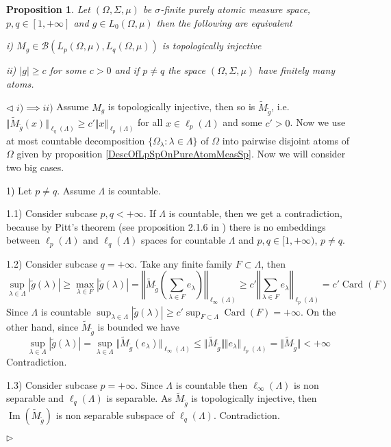 \documentclass[12pt]{article}
\newtheorem{proposition}[theorem]{Proposition}
\newenvironment{proof}{\par $\triangleleft$}{$\triangleright$}
\begin{document}
\begin{proposition}\label{TopInjMultOpCharacOnPureAtomMeasSp} Let $(\Omega,\Sigma,\mu)$ be $\sigma$-finite purely atomic measure space, $p,q\in[1,+\infty]$ and $g\in L_0(\Omega,\mu)$ then the following are equivalent

i) $M_g\in\mathcal{B}(L_p(\Omega,\mu),L_q(\Omega,\mu))$ is topologically injective

ii) $|g|\geq c$ for some $c>0$ and if $p\neq q$ the space $(\Omega,\Sigma,\mu)$ have finitely many atoms.
\end{proposition}
\begin{proof}
$i)\implies ii)$ Assume $M_g$ is topologically injective, then so is $\widetilde{M}_{\widetilde{g}}$, i.e. $\Vert\widetilde{M}_{\widetilde{g}}(x)\Vert_{\ell_q(\Lambda)}\geq c'\Vert x\Vert_{\ell_p(\Lambda)}$ for all $x\in\ell_p(\Lambda)$ and some $c'>0$. Now we use at most countable decomposition $\{\Omega_\lambda:\lambda\in\Lambda\}$ of $\Omega$ into pairwise disjoint atoms of $\Omega$ given by proposition \ref{DescOfLpSpOnPureAtomMeasSp}. Now we will consider two big cases.

1) Let $p\neq q$. Assume $\Lambda$ is countable.

1.1) Consider subcase $p,q<+\infty$. If $\Lambda$ is countable, then we get a  contradiction, because by Pitt's theorem (see proposition 2.1.6 in \cite{KalAlbTopicsBanSpTh}) there is no embeddings between $\ell_p(\Lambda)$ and $\ell_q(\Lambda)$ spaces for countable $\Lambda$ and $p,q\in[1,+\infty)$, $p\neq q$.

1.2) Consider subcase $q=+\infty$. Take any finite family $F\subset\Lambda$, then
$$
\sup_{\lambda\in\Lambda}|\widetilde{g}(\lambda)|
\geq\max_{\lambda\in F}|\widetilde{g}(\lambda)|
=\left\Vert\widetilde{M}_{\widetilde{g}}\left(\sum_{\lambda\in F}e_\lambda\right)\right\Vert_{\ell_\infty(\Lambda)}
\geq c'\left\Vert\sum_{\lambda\in F}e_\lambda\right\Vert_{\ell_p(\Lambda)}
=c'\operatorname{Card}(F)
$$
Since $\Lambda$ is countable $\sup_{\lambda\in\Lambda}|\widetilde{g}(\lambda)|\geq c'\sup_{F\subset\Lambda}\operatorname{Card}(F)=+\infty$. On the other hand, since $\widetilde{M}_{\widetilde{g}}$ is bounded we have
$$\sup_{\lambda\in\Lambda}|\widetilde{g}(\lambda)|
=\sup_{\lambda\in\Lambda}\Vert\widetilde{M}_{\widetilde{g}}(e_\lambda)\Vert_{\ell_\infty(\Lambda)}
\leq\Vert\widetilde{M}_{\widetilde{g}}\Vert\Vert e_\lambda\Vert_{\ell_p(\Lambda)}
=\Vert\widetilde{M}_{\widetilde{g}}\Vert<+\infty
$$
Contradiction.

1.3) Consider subcase $p=+\infty$. Since $\Lambda$ is countable then $\ell_\infty(\Lambda)$ is non separable and $\ell_q(\Lambda)$ is separable. As $\widetilde{M}_{\widetilde{g}}$ is topologically injective, then $\operatorname{Im}(\widetilde{M}_{\widetilde{g}})$ is non separable subspace of $\ell_q(\Lambda)$. Contradiction.


\end{proof}
\end{document}
